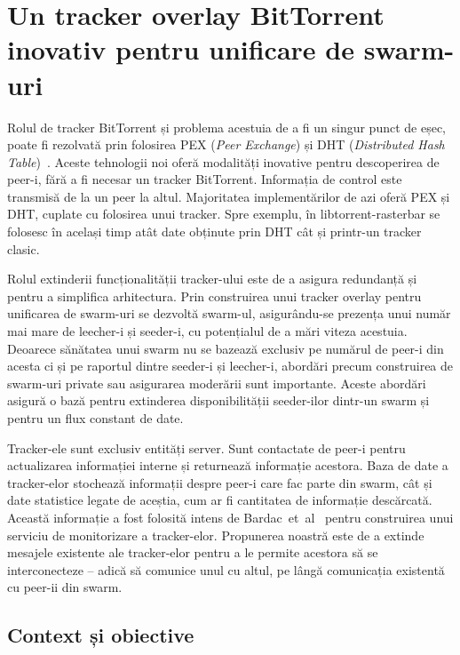 
\chapter{Un tracker overlay BitTorrent inovativ pentru unificare de swarm-uri}
\label{chapter:unified-tracker}

Rolul de tracker BitTorrent și problema acestuia de a fi un singur punct de
eșec, poate fi rezolvată prin folosirea PEX (\textit{Peer Exchange}) și DHT
(\textit{Distributed Hash Table})~\cite{dht-paper}. Aceste tehnologii noi
oferă modalități inovative pentru descoperirea de peer-i, fără a fi necesar un
tracker BitTorrent. Informația de control este transmisă de la un peer la
altul. Majoritatea implementărilor de azi oferă PEX și DHT, cuplate cu
folosirea unui tracker. Spre exemplu, în libtorrent-rasterbar se folosesc în același timp atât date obținute prin DHT cât și printr-un tracker clasic.

Rolul extinderii funcționalității tracker-ului este de a asigura redundanță și pentru a simplifica arhitectura. Prin construirea unui tracker overlay pentru unificarea de swarm-uri se dezvoltă swarm-ul, asigurându-se prezența unui număr mai mare de leecher-i și seeder-i, cu potențialul de a mări viteza acestuia. Deoarece sănătatea unui swarm nu se bazează exclusiv pe numărul de peer-i din acesta ci și pe raportul dintre seeder-i și leecher-i, abordări precum construirea de swarm-uri private sau asigurarea moderării sunt importante. Aceste abordări asigură o bază pentru extinderea disponibilității seeder-ilor dintr-un swarm și pentru un flux constant de date.

Tracker-ele sunt exclusiv entități server. Sunt contactate de peer-i pentru
actualizarea informației interne și returnează informație acestora. Baza de
date a tracker-elor stochează informații despre peer-i care fac parte din
swarm, cât și date statistice legate de aceștia, cum ar fi cantitatea de
informație descărcată. Această informație a fost folosită intens de Bardac~et~al~\cite{tracker-mon} pentru construirea unui serviciu de monitorizare a tracker-elor. Propunerea noastră este de a extinde mesajele existente ale tracker-elor pentru a le permite acestora să se interconecteze -- adică să comunice unul cu altul, pe lângă comunicația existentă cu peer-ii din swarm.

\section{Context și obiective}
\label{sec:unified-tracker:context}

